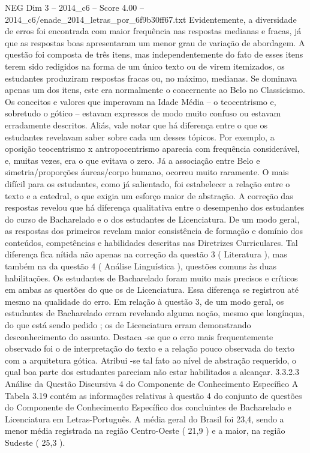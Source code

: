 \begin{textsample}{NEG Dim 3 – 2014\_c6 – Score 4.00 – 2014\_c6/enade\_2014\_letras\_por\_6f9b30ff67.txt}
Evidentemente, a diversidade de erros foi encontrada com maior frequência nas respostas medianas e fracas, já que as respostas boas apresentaram um menor grau de variação de abordagem.
A questão foi composta de três itens, mas independentemente do fato de esses itens terem sido redigidos na forma de um único texto ou de virem itemizados, os estudantes produziram respostas fracas ou, no máximo, medianas.
Se dominava apenas um dos itens, este era normalmente o concernente ao Belo no Classicismo.
Os conceitos e valores que imperavam na Idade Média – o teocentrismo e, sobretudo o gótico – estavam expressos de modo muito confuso ou estavam erradamente descritos.
Aliás, vale notar que há diferença entre o que os estudantes revelavam saber sobre cada um desses tópicos.
Por exemplo, a oposição teocentrismo x antropocentrismo aparecia com frequência considerável, e, muitas vezes, era o que evitava o zero.
Já a associação entre Belo e simetria/proporções áureas/corpo humano, ocorreu muito raramente.
O mais difícil para os estudantes, como já salientado, foi estabelecer a relação entre o texto e a catedral, o que exigia um esforço maior de abstração.
A correção das respostas revelou que há diferença qualitativa entre o desempenho dos estudantes do curso de Bacharelado e o dos estudantes de Licenciatura.
De um modo geral, as respostas dos primeiros revelam maior consistência de formação e domínio dos conteúdos, competências e habilidades descritas nas Diretrizes Curriculares.
Tal diferença fica nítida não apenas na correção da questão 3 ( Literatura ), mas também na da questão 4 ( Análise Linguística ), questões comuns às duas habilitações.
Os estudantes de Bacharelado foram muito mais precisos e críticos em ambas as questões do que os de Licenciatura.
Essa diferença se registrou até mesmo na qualidade do erro.
Em relação à questão 3, de um modo geral, os estudantes de Bacharelado erram revelando alguma noção, mesmo que longínqua, do que está sendo pedido ; os de Licenciatura erram demonstrando desconhecimento do assunto.
Destaca -se que o erro mais frequentemente observado foi o de interpretação do texto e a relação pouco observada do texto com a arquitetura gótica.
Atribui -se tal fato ao nível de abstração requerido, o qual boa parte dos estudantes pareciam não estar habilitados a alcançar. 3.3.2.3 Análise da Questão Discursiva 4 do Componente de Conhecimento Específico A Tabela 3.19 contém as informações relativas à questão 4 do conjunto de questões do Componente de Conhecimento Específico dos concluintes de Bacharelado e Licenciatura em Letras-Português.
A média geral do Brasil foi 23,4, sendo a menor média registrada na região Centro-Oeste ( 21,9 ) e a maior, na região Sudeste ( 25,3 ).

\end{textsample}
